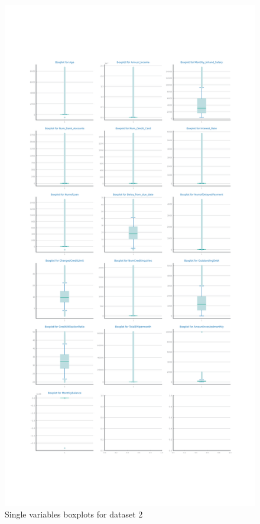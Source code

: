 \documentclass[10pt]{extarticle}
\begin{document}
\begin{figure}[H]
\centering\includegraphics[scale=0.35]{images/dataset2/data_profiling/Credit_Score_single_boxplots.png}
\caption{Single variables boxplots for dataset 2}
\end{figure}
\end{document}
